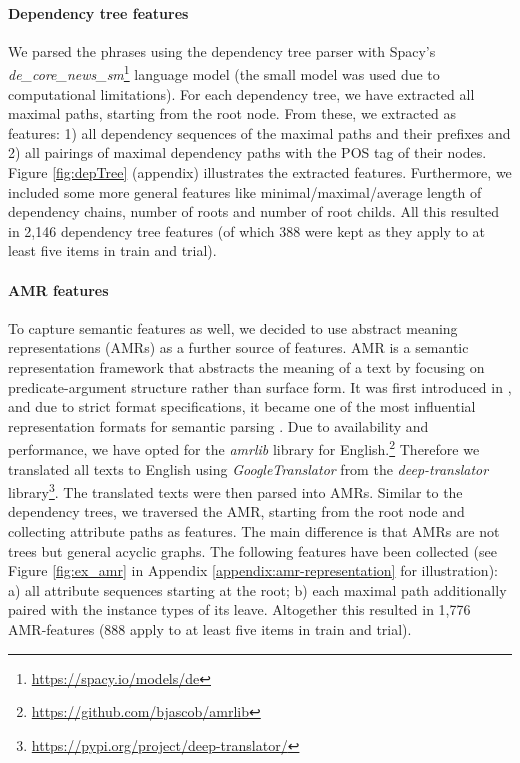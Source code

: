 \documentclass[11pt]{article}
\begin{document}
\paragraph{Dependency tree features}

We parsed the phrases using the dependency tree parser with Spacy's \textit{de\_core\_news\_sm}\footnote{\url{https://spacy.io/models/de}}  language model (the small model was used due to computational limitations). For each dependency tree, we have extracted all maximal paths, starting from the root node. From these, we extracted as features: 1) all dependency sequences of the maximal paths and their prefixes and 2) all pairings of maximal dependency paths with the POS tag of their nodes. Figure \ref{fig:depTree} (appendix) illustrates the extracted features. Furthermore, we included some more general features like minimal/maximal/average length of dependency chains, number of roots and number of root childs. 
All this resulted in 2,146 dependency tree features (of which 388 were kept as they apply to at least five items in train and trial).   

\paragraph{AMR features}

To capture semantic features as well, we decided to use abstract meaning representations (AMRs) as a further source of features. AMR is a semantic representation framework that abstracts the meaning of a text by focusing on predicate-argument structure rather than surface form. It was first introduced in \citet{langkilde-knight-1998-generation}, and due to strict format specifications, it became one of the most influential representation formats for semantic parsing \citep{Banarescu2013AbstractMR}. Due to availability and performance, we have opted for the \emph{amrlib} library for English.\footnote{\url{https://github.com/bjascob/amrlib}} Therefore we translated all texts to English using \emph{GoogleTranslator} from the \emph{deep-translator} library\footnote{\url{https://pypi.org/project/deep-translator/}}. The translated texts were then parsed into AMRs. Similar to the dependency trees, we traversed the AMR, starting from the root node and collecting attribute paths as features. The main difference is that AMRs are not trees but general acyclic graphs. The following features have been collected (see Figure \ref{fig:ex_amr} in Appendix \ref{appendix:amr-representation} for illustration): a) all attribute sequences starting at the root; b) each maximal path additionally paired with the instance types of its leave. Altogether this resulted in 1,776 AMR-features (888 apply to at least five items in train and trial). 
\end{document}
